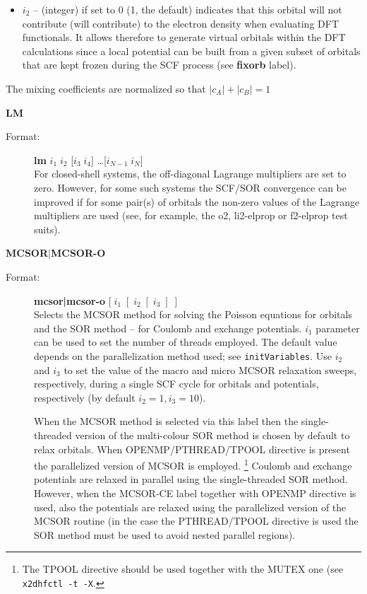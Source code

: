 \documentclass[10pt,a4paper]{article}
\newcommand{\ft}[1]{\texttt{#1}}
\newcommand{\fb}[1]{\textbf{#1}}
\begin{document}
\begin{description}
\begin{description}
\begin{description}
\begin{itemize}
\item[] $i_2$ -- (integer) if set to 0 (1, the default) indicates that this
  orbital will not contribute (will contribute) to the electron density
  when evaluating DFT functionals. It allows therefore to generate
  virtual orbitals within the DFT calculations since a local potential can
  be built from a given subset of orbitals that are kept frozen during the
  SCF process (see \fb{fixorb} label).

\end{itemize}
The mixing coefficients are normalized so that $|c_A|+|c_B|=1$

\end{description}
\end{description}

\item \textbf{LM}
\begin{description}
\item[Format:] \textbf{lm} $i_1 \; i_2$ [\;$i_3 \;i_4$\;] \ldots [\;$i_{N-1} \;i_{N}$\;] \\
  For closed-shell systems, the off-diagonal Lagrange multipliers are set to
  zero. However, for some such systems the SCF/SOR convergence can be
  improved if for some pair(s) of orbitals the non-zero values of the
  Lagrange multipliers are used (see, for example, the o2, li2-elprop or
  f2-elprop test suits).
\end{description}

\item \textbf{MCSOR$|$MCSOR-O}
\begin{description}
\item[Format:] \textbf{mcsor|mcsor-o} $[\;i_1\;[\;i_2\;[\;i_3\;]\;]$\\
  Selects the MCSOR method for solving the Poisson equations for orbitals
  and the SOR method -- for Coulomb and exchange potentials. $i_1$
  parameter can be used to set the number of threads employed. The default
  value depends on the parallelization method used; see
  \ft{initVariables}. Use $i_2$ and $i_3$ to set the value of the 
  macro and micro MCSOR relaxation sweeps, respectively, during a single SCF
  cycle for orbitals and potentials, respectively (by default
  $i_2=1, i_3=10$).

  When the MCSOR method is selected via this label then the single-threaded
  version of the multi-colour SOR method is chosen by default to relax
  orbitals. When OPENMP/PTHREAD/TPOOL directive is present the parallelized
  version of MCSOR is employed.%
  \footnote{The TPOOL directive should be used together with the MUTEX one
    (see \ft{x2dhfctl -t -X}.}  Coulomb and exchange potentials are relaxed
  in parallel using the single-threaded SOR method. However, when the
  MCSOR-CE label together with OPENMP directive is used, also the
  potentials are relaxed using the parallelized version of the MCSOR
  routine (in the case the PTHREAD/TPOOL directive is used the SOR method
  must be used to avoid nested parallel regions).


\end{description}
\end{description}
\end{document}
